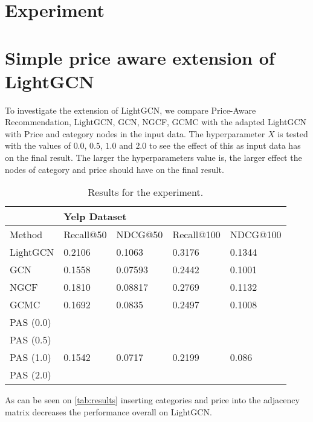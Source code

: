 \section{Experiment}


\section{Simple price aware extension of LightGCN}
To investigate the extension of LightGCN, we compare Price-Aware Recommendation, LightGCN, GCN, NGCF, GCMC with the adapted LightGCN with Price and category nodes in the input data.
The hyperparameter $X$ is tested with the values of $0.0$, $0.5$, $1.0$ and $2.0$ to see the effect of this as input data has on the final result.
The larger the hyperparameters value is, the larger effect the nodes of category and price should have on the final result.
\begin{table*}[h!]
    \centering
    \begin{tabular}{|l|l|l|l|l|}
        \hline
        \rowcolor[HTML]{FFFFFF}
                  & \multicolumn{4}{l|}{\cellcolor[HTML]{FFFFFF}Yelp Dataset}                                   \\ \hline
        Method    & Recall@50                                                 & NDCG@50 & Recall@100 & NDCG@100 \\ \hline
        LightGCN  & 0.2106                                                    & 0.1063  & 0.3176     & 0.1344   \\ \hline
        GCN       & 0.1558                                                    & 0.07593 & 0.2442     & 0.1001   \\ \hline
        NGCF      & 0.1810                                                    & 0.08817 & 0.2769     & 0.1132   \\ \hline
        GCMC      & 0.1692                                                    & 0.0835  & 0.2497     & 0.1008   \\ \hline
        PAS (0.0) &                                                           &         &            &          \\ \hline
        PAS (0.5) &                                                           &         &            &          \\ \hline
        PAS (1.0) & 0.1542                                                    & 0.0717  & 0.2199     & 0.086    \\ \hline
        PAS (2.0) &                                                           &         &            &          \\ \hline
    \end{tabular}
    \caption{Results for the experiment.}
    \label{tab:results}
\end{table*}
As can be seen on \autoref{tab:results} inserting categories and price into the adjacency matrix decreases the performance overall on LightGCN.
